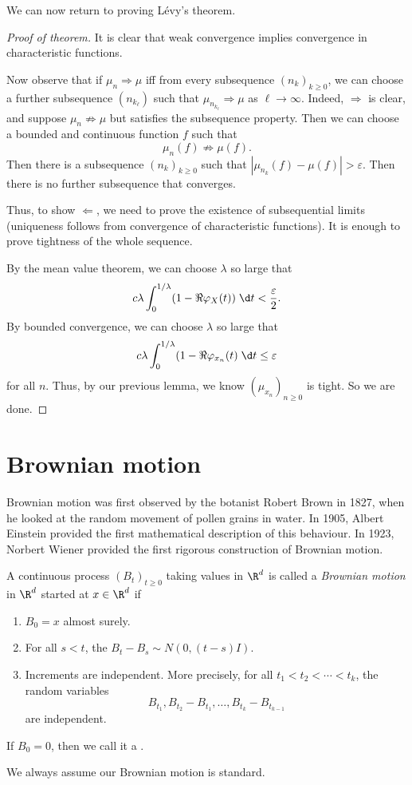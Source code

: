 \documentclass[a4paper]{article}
\begin{document}
We can now return to proving L\'evy's theorem.
\begin{proof}[Proof of theorem]
  It is clear that weak convergence implies convergence in characteristic functions.

  Now observe that if $\mu_n \Rightarrow \mu$ iff from every subsequence $(n_k)_{k \geq 0}$, we can choose a further subsequence $(n_{k_\ell})$ such that $\mu_{n_{k_{\ell}}} \Rightarrow \mu$ as $\ell \to \infty$. Indeed, $\Rightarrow$ is clear, and suppose $\mu_n \not \Rightarrow \mu$ but satisfies the subsequence property. Then we can choose a bounded and continuous function $f$ such that
  \[
    \mu_n(f) \not \Rightarrow \mu(f).
  \]
  Then there is a subsequence $(n_k)_{k \geq 0}$ such that $|\mu_{n_k}(f) - \mu(f)| > \varepsilon$. Then there is no further subsequence that converges.

  Thus, to show $\Leftarrow$, we need to prove the existence of subsequential limits (uniqueness follows from convergence of characteristic functions). It is enough to prove tightness of the whole sequence.

  By the mean value theorem, we can choose $\lambda$ so large that
  \[
    c \lambda \int_0^{1/\lambda} (1 - \Re \varphi_X(t)) \;\d t < \frac{\varepsilon}{2}.
  \]
  By bounded convergence, we can choose $\lambda$ so large that
  \[
    c \lambda \int_0^{1/\lambda} (1 - \Re \varphi_{x_n}(t)\;\d t \leq \varepsilon
  \]
  for all $n$. Thus, by our previous lemma, we know $(\mu_{x_n})_{n \geq 0}$ is tight. So we are done.
\end{proof}

\section{Brownian motion}
Brownian motion was first observed by the botanist Robert Brown in 1827, when he looked at the random movement of pollen grains in water. In 1905, Albert Einstein provided the first mathematical description of this behaviour. In 1923, Norbert Wiener provided the first rigorous construction of Brownian motion.

\begin{defi}
  A continuous process $(B_t)_{t \geq 0}$ taking values in $\R^d$ is called a \emph{Brownian motion} in $\R^d$ started at $x \in \R^d$ if
  \begin{enumerate}
    \item $B_0 = x$ almost surely.
    \item For all $s < t$, the  $B_t - B_s \sim N(0, (t - s) I)$.
    \item Increments are independent. More precisely, for all $t_1 < t_2 < \cdots < t_k$, the random variables
      \[
        B_{t_1}, B_{t_2} - B_{t_1}, \ldots, B_{t_k} - B_{t_{k - 1}}
      \]
      are independent.
  \end{enumerate}
  If $B_0 = 0$, then we call it a .
\end{defi}
We always assume our Brownian motion is standard.
\end{document}
